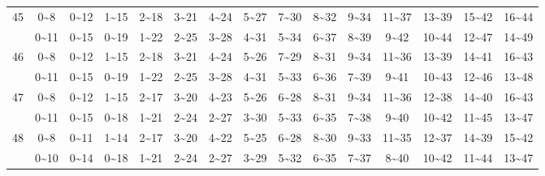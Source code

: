 \documentclass[lang=cn,10pt]{elegantbook}
\begin{document}
\begin{longtable}{c|cccccccccccccc}
    45 & 0\textasciitilde8 & 0\textasciitilde12 & 1\textasciitilde15 & 2\textasciitilde18 & 3\textasciitilde21 & 4\textasciitilde24 & 5\textasciitilde27 & 7\textasciitilde30 & 8\textasciitilde32 & 9\textasciitilde34 & 11\textasciitilde37 & 13\textasciitilde39 & 15\textasciitilde42 & 16\textasciitilde44 \\
       & 0\textasciitilde11 & 0\textasciitilde15 & 0\textasciitilde19 & 1\textasciitilde22 & 2\textasciitilde25 & 3\textasciitilde28 & 4\textasciitilde31 & 5\textasciitilde34 & 6\textasciitilde37 & 8\textasciitilde39 & 9\textasciitilde42 & 10\textasciitilde44 & 12\textasciitilde47 & 14\textasciitilde49 \\
    46 & 0\textasciitilde8 & 0\textasciitilde12 & 1\textasciitilde15 & 2\textasciitilde18 & 3\textasciitilde21 & 4\textasciitilde24 & 5\textasciitilde26 & 7\textasciitilde29 & 8\textasciitilde31 & 9\textasciitilde34 & 11\textasciitilde36 & 13\textasciitilde39 & 14\textasciitilde41 & 16\textasciitilde43 \\
       & 0\textasciitilde11 & 0\textasciitilde15 & 0\textasciitilde19 & 1\textasciitilde22 & 2\textasciitilde25 & 3\textasciitilde28 & 4\textasciitilde31 & 5\textasciitilde33 & 6\textasciitilde36 & 7\textasciitilde39 & 9\textasciitilde41 & 10\textasciitilde43 & 12\textasciitilde46 & 13\textasciitilde48 \\
    47 & 0\textasciitilde8 & 0\textasciitilde12 & 1\textasciitilde15 & 2\textasciitilde17 & 3\textasciitilde20 & 4\textasciitilde23 & 5\textasciitilde26 & 6\textasciitilde28 & 8\textasciitilde31 & 9\textasciitilde34 & 11\textasciitilde36 & 12\textasciitilde38 & 14\textasciitilde40 & 16\textasciitilde43 \\
       & 0\textasciitilde11 & 0\textasciitilde15 & 0\textasciitilde18 & 1\textasciitilde21 & 2\textasciitilde24 & 2\textasciitilde27 & 3\textasciitilde30 & 5\textasciitilde33 & 6\textasciitilde35 & 7\textasciitilde38 & 9\textasciitilde40 & 10\textasciitilde42 & 11\textasciitilde45 & 13\textasciitilde47 \\
    48 & 0\textasciitilde8 & 0\textasciitilde11 & 1\textasciitilde14 & 2\textasciitilde17 & 3\textasciitilde20 & 4\textasciitilde22 & 5\textasciitilde25 & 6\textasciitilde28 & 8\textasciitilde30 & 9\textasciitilde33 & 11\textasciitilde35 & 12\textasciitilde37 & 14\textasciitilde39 & 15\textasciitilde42 \\
       & 0\textasciitilde10 & 0\textasciitilde14 & 0\textasciitilde18 & 1\textasciitilde21 & 2\textasciitilde24 & 2\textasciitilde27 & 3\textasciitilde29 & 5\textasciitilde32 & 6\textasciitilde35 & 7\textasciitilde37 & 8\textasciitilde40 & 10\textasciitilde42 & 11\textasciitilde44 & 13\textasciitilde47 \\

\end{longtable}
\end{document}
